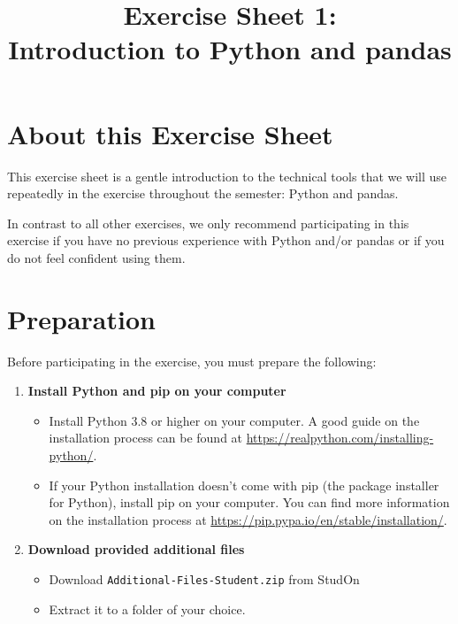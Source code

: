 \documentclass[
english,
smallborders
]{i6prcsht}
\begin{document}
\title{Exercise Sheet 1: \\ Introduction to Python and pandas}
\maketitle
\vspace*{-2cm}

\section*{About this Exercise Sheet}

This exercise sheet is a gentle introduction to the technical tools that we will use repeatedly in the exercise throughout the semester: Python and pandas.

In contrast to all other exercises, we only recommend participating in this exercise if you have no previous experience with Python and/or pandas or if you do not feel confident using them.

\section*{Preparation}

Before participating in the exercise, you must prepare the following:

\begin{enumerate}
	\item \textbf{Install Python and pip on your computer}
	      
	      \begin{itemize}
		      \item Install Python 3.8 or higher on your computer.
		            A good guide on the installation process can be found at \url{https://realpython.com/installing-python/}.
		      \item If your Python installation doesn't come with pip (the package installer for Python), install pip on your computer.
		            You can find more information on the installation process at \url{https://pip.pypa.io/en/stable/installation/}.
	      \end{itemize}
	      
	\item \textbf{Download provided additional files}
	      
	      \begin{itemize}
		      \item Download \texttt{Additional-Files-Student.zip} from StudOn
		      \item Extract it to a folder of your choice.
	      \end{itemize}
	      
\end{enumerate}
\end{document}
